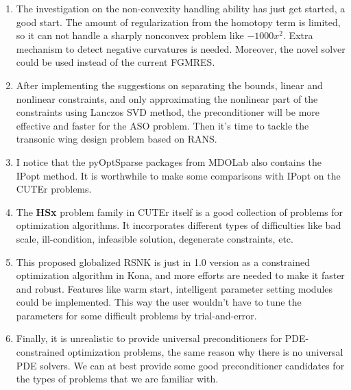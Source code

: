 \begin{enumerate}
\item The investigation on the non-convexity handling ability has just get started, a good start. 
The amount of regularization from the homotopy term is limited, so it can not handle a sharply 
nonconvex problem like $-1000x^2$.  Extra mechanism to detect negative curvatures is needed. 
Moreover, the novel solver \cite{hicken:flecs2014} could be used instead of the current FGMRES. 

\item After implementing the suggestions on separating the bounds, linear and nonlinear constraints, and  
only approximating the nonlinear part of the constraints using Lanczos SVD method, the preconditioner 
will be more effective and faster for the ASO problem. Then it's time to 
tackle the transonic wing design problem based on RANS. 

\item I notice that the pyOptSparse packages from MDOLab also contains the IPopt method. It is 
worthwhile to make some comparisons with IPopt on the CUTEr problems. 

\item The \textbf{HSx} problem family in CUTEr itself is a good collection of problems for optimization 
algorithms. It incorporates different types of difficulties like bad scale, ill-condition, infeasible solution, 
degenerate constraints, etc.  

\item This proposed globalized RSNK is just in 1.0 version as a constrained optimization algorithm 
in Kona, and more efforts are needed to make it faster and robust. Features like warm start, 
intelligent parameter setting modules could be implemented. This way the user wouldn't have to 
tune the parameters for some difficult problems by trial-and-error.  

\item Finally, it is unrealistic to provide universal preconditioners for PDE-constrained optimization 
problems, the same reason why there is no universal PDE solvers. We can at best provide some good 
preconditioner candidates for the types of problems that we are familiar with. 

\end{enumerate}




